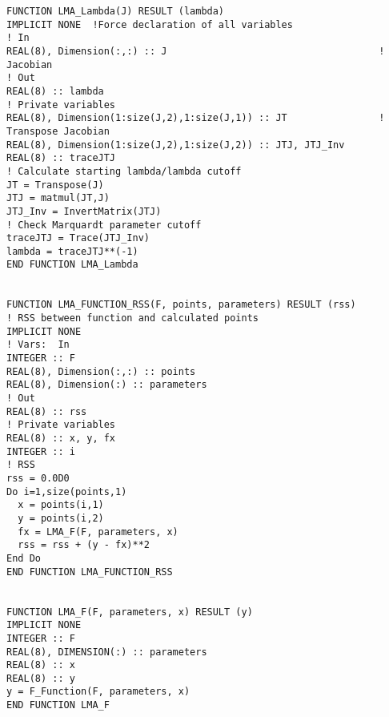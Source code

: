\begin{lstlisting}[style=sFortran,caption={Add two numbers function}]
FUNCTION LMA_Lambda(J) RESULT (lambda)
IMPLICIT NONE  !Force declaration of all variables
! In
REAL(8), Dimension(:,:) :: J                                     ! Jacobian
! Out
REAL(8) :: lambda
! Private variables
REAL(8), Dimension(1:size(J,2),1:size(J,1)) :: JT                ! Transpose Jacobian
REAL(8), Dimension(1:size(J,2),1:size(J,2)) :: JTJ, JTJ_Inv
REAL(8) :: traceJTJ
! Calculate starting lambda/lambda cutoff
JT = Transpose(J)
JTJ = matmul(JT,J)
JTJ_Inv = InvertMatrix(JTJ)
! Check Marquardt parameter cutoff
traceJTJ = Trace(JTJ_Inv)
lambda = traceJTJ**(-1)
END FUNCTION LMA_Lambda


FUNCTION LMA_FUNCTION_RSS(F, points, parameters) RESULT (rss)
! RSS between function and calculated points
IMPLICIT NONE
! Vars:  In
INTEGER :: F
REAL(8), Dimension(:,:) :: points
REAL(8), Dimension(:) :: parameters
! Out
REAL(8) :: rss
! Private variables
REAL(8) :: x, y, fx
INTEGER :: i
! RSS
rss = 0.0D0
Do i=1,size(points,1)
  x = points(i,1)
  y = points(i,2)
  fx = LMA_F(F, parameters, x)
  rss = rss + (y - fx)**2
End Do
END FUNCTION LMA_FUNCTION_RSS


FUNCTION LMA_F(F, parameters, x) RESULT (y)
IMPLICIT NONE
INTEGER :: F
REAL(8), DIMENSION(:) :: parameters
REAL(8) :: x
REAL(8) :: y
y = F_Function(F, parameters, x)
END FUNCTION LMA_F

\end{lstlisting}


